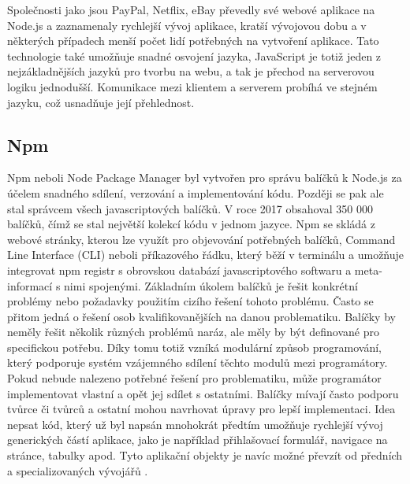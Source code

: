 Společnosti jako jsou PayPal, Netflix, eBay převedly své webové aplikace na Node.js a zaznamenaly rychlejší vývoj aplikace, kratší vývojovou dobu a v některých případech menší počet lidí potřebných na vytvoření aplikace. Tato technologie také umožňuje snadné osvojení jazyka, JavaScript je totiž jeden z nejzákladnějších jazyků pro tvorbu na webu, a tak je přechod na serverovou logiku jednodušší. Komunikace mezi klientem a serverem probíhá ve stejném jazyku, což usnadňuje její přehlednost.

        \subsection{Npm}
Npm neboli Node Package Manager byl vytvořen pro správu balíčků k Node.js za účelem snadného sdílení, verzování a implementování kódu. Později se pak ale stal správcem všech javascriptových balíčků. V roce 2017 obsahoval 350 000 balíčků, čímž se stal největší kolekcí kódu v jednom jazyce. Npm se skládá z webové stránky, kterou lze využít pro objevování potřebných balíčků, Command Line Interface (CLI) neboli příkazového řádku, který běží v terminálu a umožňuje integrovat npm registr s obrovskou databází javascriptového softwaru a meta-informací s nimi spojenými. Základním úkolem balíčků je řešit konkrétní problémy nebo požadavky použitím cizího řešení tohoto problému. Často se přitom jedná o řešení osob kvalifikovanějších na danou problematiku. Balíčky by neměly řešit několik různých problémů naráz, ale měly by být definované pro specifickou potřebu. Díky tomu totiž vzníká modulární způsob programování, který podporuje systém vzájemného sdílení těchto modulů mezi programátory. Pokud nebude nalezeno potřebné řešení pro problematiku, může programátor implementovat vlastní a opět jej sdílet s ostatními. Balíčky mívají často podporu tvůrce či tvůrců a ostatní mohou navrhovat úpravy pro lepší implementaci. Idea nepsat kód, který už byl napsán mnohokrát předtím umožňuje rychlejší vývoj generických částí aplikace, jako je například přihlašovací formulář, navigace na stránce, tabulky apod. Tyto aplikační objekty je navíc možné převzít od předních a specializovaných vývojářů \cite{npmdocs}. 
